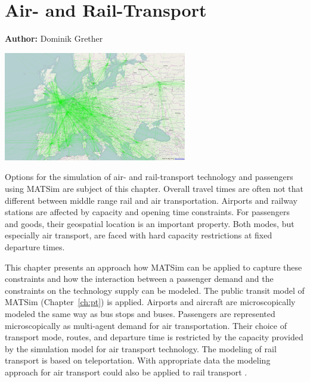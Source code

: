 \chapter{Air- and Rail-Transport}
\label{ch:air}

\hfill \textbf{Author:} Dominik Grether

\begin{center} \includegraphics[width=0.6\textwidth, angle=0]{extending/figures/air/air_network_europe_osm} \end{center}


Options for the simulation of air- and rail-transport technology and passengers using MATSim are subject of this chapter. 
Overall travel times are often not that different between middle range rail and air transportation. 
Airports and railway stations are affected by capacity and opening time constraints. 
For passengers and goods, their geospatial location is an important property. 
Both modes, but especially air transport, are faced with hard capacity restrictions at fixed departure times. 

This chapter presents an approach how MATSim can be applied to capture these constraints and how the interaction between a passenger demand and the constraints on the technology supply can be modeled. 
The public transit model of MATSim (Chapter~\ref{ch:pt}) is applied. %
Airports and aircraft are microscopically modeled the same way as bus stops and buses. 
Passengers are represented microscopically as multi-agent demand for air transportation. 
Their choice of transport mode, routes, and departure time is restricted by the capacity provided by the simulation model for air transport technology. 
The modeling of rail transport is based on teleportation. 
With appropriate data the modeling approach for air transport could also be applied to rail transport \citep{Quick2012BARailTraffic}.  


